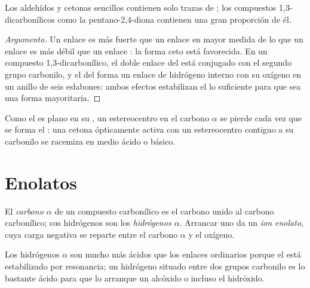 \begin{proposition}\label{prop:b2:enolates-aldol:enol-content}
Los aldehídos y cetonas sencillos contienen solo trazas de ; los compuestos 1,3-dicarbonílicos como
la pentano-2,4-diona contienen una gran proporción de él.
\end{proposition}

\begin{proof}[Argumento]
Un enlace  es más fuerte que un enlace  en mayor medida de lo que un enlace  es más débil que un enlace
: la forma ceto está favorecida. En un compuesto 1,3-dicarbonílico, el doble enlace del  está conjugado
con el segundo grupo carbonilo, y el  del  forma un enlace de hidrógeno interno con su oxígeno
en un anillo de seis eslabones: ambos efectos estabilizan el  lo suficiente para que sea una forma mayoritaria.
\end{proof}

Como el  es plano en su , un estereocentro en el carbono $\alpha$ se pierde cada vez que
se forma el : una cetona ópticamente activa con un estereocentro contiguo a su carbonilo se racemiza en medio ácido
o básico.

\section{Enolatos}

\begin{definition}[Enolatos]\label{def:b2:enolates-aldol:enolate}
El \emph{carbono $\alpha$} de un compuesto carbonílico es el carbono
unido al carbono carbonílico; sus hidrógenos son los \emph{hidrógenos $\alpha$}.
Arrancar uno da un \emph{ion enolato}, cuya
carga negativa se reparte entre el carbono $\alpha$ y el oxígeno.
\end{definition}

\begin{proposition}\label{prop:b2:enolates-aldol:alpha-acidity}
Los hidrógenos $\alpha$ son mucho más ácidos que los enlaces  ordinarios porque el  está estabilizado
por resonancia; un hidrógeno situado entre dos grupos carbonilo es lo bastante ácido para que lo arranque un alcóxido o
incluso el hidróxido.
\end{proposition}

